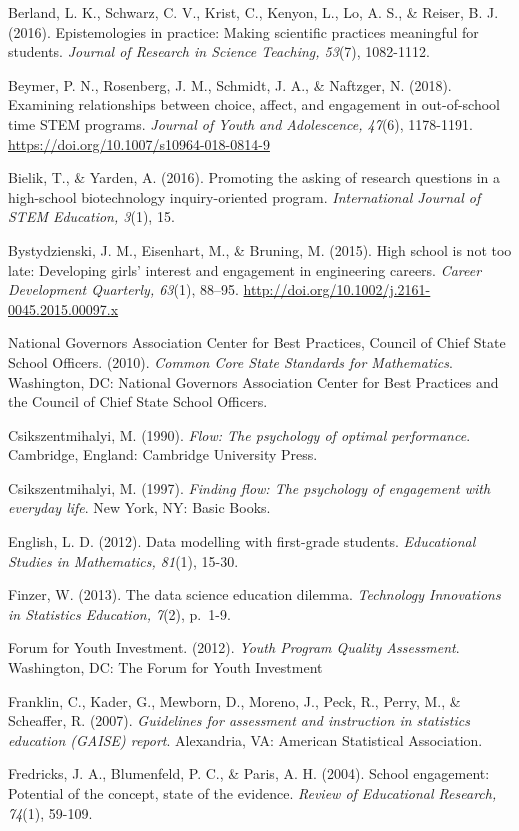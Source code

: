 \documentclass[]{book}
\theoremstyle{definition}
\theoremstyle{definition}
\theoremstyle{definition}
\theoremstyle{remark}
\begin{document}
Berland, L. K., Schwarz, C. V., Krist, C., Kenyon, L., Lo, A. S., \&
Reiser, B. J. (2016). Epistemologies in practice: Making scientific
practices meaningful for students. \emph{Journal of Research in Science
Teaching, 53}(7), 1082-1112.

Beymer, P. N., Rosenberg, J. M., Schmidt, J. A., \& Naftzger, N. (2018).
Examining relationships between choice, affect, and engagement in
out-of-school time STEM programs. \emph{Journal of Youth and
Adolescence, 47}(6), 1178-1191.
\url{https://doi.org/10.1007/s10964-018-0814-9}

Bielik, T., \& Yarden, A. (2016). Promoting the asking of research
questions in a high-school biotechnology inquiry-oriented program.
\emph{International Journal of STEM Education, 3}(1), 15.

Bystydzienski, J. M., Eisenhart, M., \& Bruning, M. (2015). High school
is not too late: Developing girls' interest and engagement in
engineering careers. \emph{Career Development Quarterly, 63}(1), 88--95.
\url{http://doi.org/10.1002/j.2161-0045.2015.00097.x}

National Governors Association Center for Best Practices, Council of
Chief State School Officers. (2010). \emph{Common Core State Standards
for Mathematics}. Washington, DC: National Governors Association Center
for Best Practices and the Council of Chief State School Officers.

Csikszentmihalyi, M. (1990). \emph{Flow: The psychology of optimal
performance}. Cambridge, England: Cambridge University Press.

Csikszentmihalyi, M. (1997). \emph{Finding flow: The psychology of
engagement with everyday life}. New York, NY: Basic Books.

English, L. D. (2012). Data modelling with first-grade students.
\emph{Educational Studies in Mathematics, 81}(1), 15-30.

Finzer, W. (2013). The data science education dilemma. \emph{Technology
Innovations in Statistics Education, 7}(2), p.~1-9.

Forum for Youth Investment. (2012). \emph{Youth Program Quality
Assessment}. Washington, DC: The Forum for Youth Investment

Franklin, C., Kader, G., Mewborn, D., Moreno, J., Peck, R., Perry, M.,
\& Scheaffer, R. (2007). \emph{Guidelines for assessment and instruction
in statistics education (GAISE) report}. Alexandria, VA: American
Statistical Association.

Fredricks, J. A., Blumenfeld, P. C., \& Paris, A. H. (2004). School
engagement: Potential of the concept, state of the evidence.
\emph{Review of Educational Research, 74}(1), 59-109.
\end{document}
